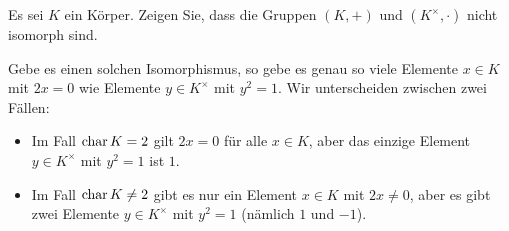 \begin{question}
  Es sei $K$ ein Körper.
  Zeigen Sie, dass die Gruppen $(K,+)$ und $(K^\times, \cdot)$ nicht isomorph sind.
\end{question}


\begin{solution}
  Gebe es einen solchen Isomorphismus, so gebe es genau so viele Elemente $x \in K$ mit $2x = 0$ wie Elemente $y \in K^\times$ mit $y^2 = 1$.
  Wir unterscheiden zwischen zwei Fällen:
  \begin{itemize}
    \item 
      Im Fall $\operatorname{char} K = 2$ gilt $2x = 0$ für alle $x \in K$, aber das einzige Element $y \in K^\times$ mit $y^2 = 1$ ist $1$.
    \item
      Im Fall $\operatorname{char} K \neq 2$ gibt es nur ein Element $x \in K$ mit $2x \neq 0$, aber es gibt zwei Elemente $y \in K^\times$ mit $y^2 = 1$ (nämlich $1$ und $-1$).
  \end{itemize}
\end{solution}


